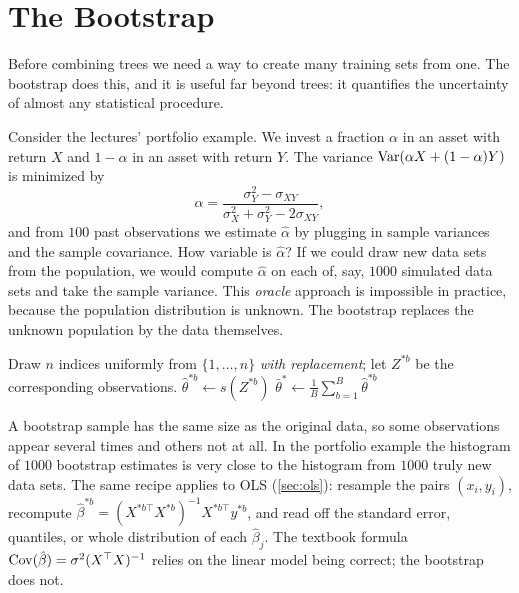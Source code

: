 \section{The Bootstrap}\label{sec:bootstrap}

Before combining trees we need a way to create many training sets from one. The bootstrap does this, and it is useful far beyond trees: it quantifies the uncertainty of almost any statistical procedure.

Consider the lectures' portfolio example. We invest a fraction $\alpha$ in an asset with return $X$ and $1-\alpha$ in an asset with return $Y$. The variance $\operatorname{Var}(\alpha X+(1-\alpha)Y)$ is minimized by
\[
\alpha=\frac{\sigma_Y^2-\sigma_{XY}}{\sigma_X^2+\sigma_Y^2-2\sigma_{XY}},
\]
and from $100$ past observations we estimate $\hat\alpha$ by plugging in sample variances and the sample covariance. How variable is $\hat\alpha$? If we could draw new data sets from the population, we would compute $\hat\alpha$ on each of, say, $1000$ simulated data sets and take the sample variance. This \emph{oracle} approach is impossible in practice, because the population distribution is unknown. The bootstrap replaces the unknown population by the data themselves.

\begin{algorithm}[H]
\caption{Bootstrap Estimate of Uncertainty}\label{alg:bootstrap}
\begin{algorithmic}[1]
  \State Draw $n$ indices uniformly from $\{1,\dots,n\}$ \emph{with replacement}; let $Z^{*b}$ be the corresponding observations.
  \State $\hat\theta^{*b}\gets s(Z^{*b})$
\EndFor
\State $\bar\theta^*\gets\frac1B\sum_{b=1}^B\hat\theta^{*b}$
\end{algorithmic}
\end{algorithm}

A bootstrap sample has the same size as the original data, so some observations appear several times and others not at all. In the portfolio example the histogram of $1000$ bootstrap estimates is very close to the histogram from $1000$ truly new data sets. The same recipe applies to OLS (\cref{sec:ols}): resample the pairs $(x_i,y_i)$, recompute $\hat\beta^{*b}=(X^{*b\top}X^{*b})^{-1}X^{*b\top}y^{*b}$, and read off the standard error, quantiles, or whole distribution of each $\hat\beta_j$. The textbook formula $\operatorname{Cov}(\hat\beta)=\sigma^2(X^{\top} X)^{-1}$ relies on the linear model being correct; the bootstrap does not.

